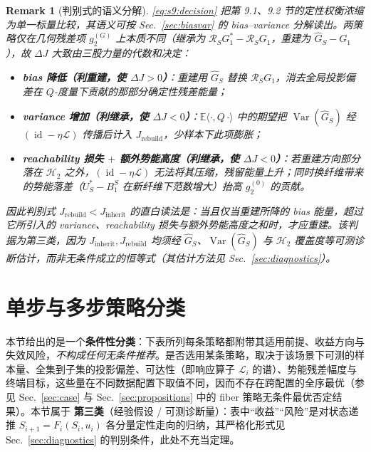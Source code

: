 \documentclass[11pt,a4paper]{article}
\newtheorem{remark}[theorem]{Remark}
\DeclareMathOperator{\Var}{Var}
\DeclareMathOperator{\id}{id}
\newcommand{\E}{\mathbb{E}}
\newcommand{\cH}{\mathcal{H}}   %
\newcommand{\cL}{\mathcal{L}}   %
\newcommand{\Rstr}{\mathcal{R}}     %
\begin{document}
\begin{remark}[判别式的语义分解]\label{rem:s9:decompose}
\eqref{eq:s9:decision} 把第 9.1、9.2 节的定性权衡浓缩为单一标量比较，其语义可按 Sec.~\ref{sec:biasvar} 的 bias--variance 分解读出。两策略仅在几何残差项 $g_2^{(G)}$ 上本质不同（继承为 $\Rstr_S G_1^*-\Rstr_S G_1$，重建为 $\widehat G_S-G_1$），故 $\Delta J$ 大致由三股力量的代数和决定：
\begin{itemize}
\item \textbf{bias 降低（利重建，使 $\Delta J>0$）}：重建用 $\widehat G_S$ 替换 $\Rstr_S G_1$，消去全局投影偏差在 $Q$-度量下贡献的那部分确定性残差能量；
\item \textbf{variance 增加（利继承，使 $\Delta J<0$）}：$\E\langle\cdot,Q\,\cdot\rangle$ 中的期望把 $\Var(\widehat G_S)$ 经 $(\id-\eta\cL)$ 传播后计入 $J_{\mathrm{rebuild}}$，少样本下此项膨胀；
\item \textbf{reachability 损失 $+$ 额外势能高度（利继承，使 $\Delta J<0$）}：若重建方向部分落在 $\cH_2$ 之外，$(\id-\eta\cL)$ 无法将其压缩，残留能量上升；同时换纤维带来的势能落差（$U_S^*-B_1^S$ 在新纤维下范数增大）抬高 $g_2^{(0)}$ 的贡献。
\end{itemize}
因此判别式 $J_{\mathrm{rebuild}}<J_{\mathrm{inherit}}$ 的直白读法是：\emph{当且仅当重建所降的 bias 能量，超过它所引入的 variance、reachability 损失与额外势能高度之和时，才应重建}。该判据为第三类，因为 $J_{\mathrm{inherit}},J_{\mathrm{rebuild}}$ 均须经 $\widehat G_S$、$\Var(\widehat G_S)$ 与 $\cH_2$ 覆盖度等可测诊断估计，而非无条件成立的恒等式（其估计方法见 Sec.~\ref{sec:diagnostics}）。
\end{remark}

\section{单步与多步策略分类}\label{sec:strategies}

本节给出的是一个\textbf{条件性分类}：下表所列每条策略都附带其适用前提、收益方向与失效风险，\emph{不构成任何无条件推荐}。是否选用某条策略，取决于该场景下可测的样本量、全集到子集的投影偏差、可达性（即响应算子 $\cL_i$ 的谱）、势能残差幅度与终端目标，这些量在不同数据配置下取值不同，因而不存在跨配置的全序最优（参见 Sec.~\ref{sec:case} 与 Sec.~\ref{sec:propositions} 中的 fiber 策略无条件最优否定结果）。本节属于 \textbf{第三类}（经验假设 / 可测诊断量）：表中“收益”“风险”是对状态递推 $S_{i+1}=F_i(S_i,u_i)$ 各分量定性走向的归纳，其严格化形式见 Sec.~\ref{sec:diagnostics} 的判别条件，此处不充当定理。
\end{document}
